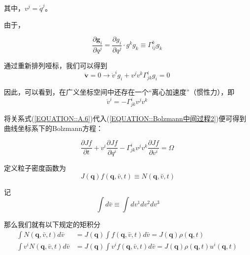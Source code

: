 \documentclass[LBMDerivation.tex]{subfiles}
\begin{document}
其中，$v^{j}=\dot{q}^{j}$。
%
%

由于，

\begin{equation}
  \frac{\partial \boldsymbol{g}_{i}}{\partial q^{j}}=\frac{\partial g_{i}}{\partial q^{j}} \cdot g^{k} g_{k} \equiv \Gamma_{i j}^{k} g_{k}
  \label{EQUATION::A.4} ~
\end{equation}
%
%

通过重新排列哑标，我们可以得到
\begin{equation}
  \dot{\boldsymbol{v}}=0 \rightarrow \dot{v}^{i} g_{i}+v^{j} v^{k} \Gamma_{j k}^{i} g_{i}=0
  \label{EQUATION::A.5} ~
\end{equation}
%
%

因此，可以看到，在广义坐标空间中还存在一个“离心加速度”（惯性力），即
%
%
\begin{equation}
  \dot{v}^{i}=- \Gamma_{j k}^{i}v^{j} v^{k}
  \label{EQUATION::A.6} ~
\end{equation}
%

将关系式(\ref{EQUATION::A.6})代入(\ref{EQUATION::Bolzmann中间过程2})便可得到曲线坐标系下的Bolzmann方程：

\begin{equation}
  \boxed{
  \frac{\partial Jf}{\partial t}+v^{i} \frac{\partial Jf}{\partial q^{i}}  - \Gamma_{j k}^{i} v^{j} v^{k}  \frac{\partial Jf}{\partial  v^{i}}  =\Omega
  }
  \label{EQUATION::Bolzamman 曲线} ~
\end{equation}







定义粒子密度函数为
\begin{equation}
  J(\boldsymbol{q}) f(\boldsymbol{q}, \bar{v}, t) \equiv N(\boldsymbol{q}, \bar{v}, t)
\end{equation}

记
\begin{equation}
  \int d \bar{v} \equiv \int d v^{1} d v^{2} d v^{3}
\end{equation}



那么我们就有以下规定的矩积分
%
%
\begin{equation}
  \begin{aligned}
    \int N(\boldsymbol{q}, \bar{v}, t)   d \bar{v}     & =J(\boldsymbol{q}) \int f(\boldsymbol{q}, \bar{v}, t)d \bar{v} =J(\boldsymbol{q}) \rho(\boldsymbol{q}, t)                                \\
    \int v^{i} N(\boldsymbol{q}, \bar{v}, t) d \bar{v} & =J(\boldsymbol{q}) \int v^{i} f(\boldsymbol{q}, \bar{v}, t)d \bar{v} =J(\boldsymbol{q}) \rho(\boldsymbol{q}, t) u^{i}(\boldsymbol{q}, t)
  \end{aligned}
  \label{EQUATION::A.11} ~
\end{equation}
%
%
\end{document}
